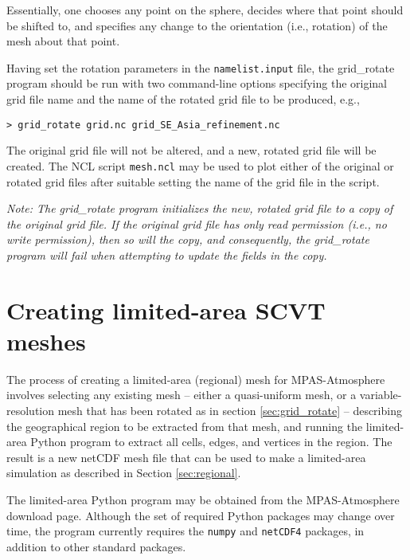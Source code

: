 \noindent Essentially, one chooses any point on the sphere, decides where that
point should be shifted to, and specifies any change to the orientation (i.e.,
rotation) of the mesh about that point. 

Having set the rotation parameters in the {\tt namelist.input} file, the
grid\_rotate program should be run with two command-line options specifying the
original grid file name and the name of the rotated grid file to be produced,
e.g.,

\vspace{12pt}
{\tt > grid\_rotate grid.nc grid\_SE\_Asia\_refinement.nc}
\vspace{12pt}

The original grid file will not be altered, and a new, rotated grid file will be
created. The NCL script {\tt mesh.ncl} may be used to plot either of the
original or rotated grid files after suitable setting the name of the grid file
in the script.

\vspace{12pt}
{\em Note: The grid\_rotate program initializes the new, rotated grid file to a copy of the original grid file.
If the original grid file has only read permission (i.e., no write permission), then so will the copy, and
consequently, the grid\_rotate program will fail when attempting to update the fields in the copy.}


\section{Creating limited-area SCVT meshes}
\label{sec:mesh_subset} 

The process of creating a limited-area (regional) mesh for MPAS-Atmosphere involves
selecting any existing mesh -- either a quasi-uniform mesh, or a variable-resolution mesh
that has been rotated as in section \ref{sec:grid_rotate} -- describing the geographical
region to be extracted from that mesh, and running the limited-area Python program to extract
all cells, edges, and vertices in the region. The result is a new netCDF mesh file that can
be used to make a limited-area simulation as described in Section \ref{sec:regional}.

The limited-area Python program may be obtained from the MPAS-Atmosphere download page. Although
the set of required Python packages may change over time, the program currently requires
the {\tt numpy} and {\tt netCDF4} packages, in addition to other standard packages.
